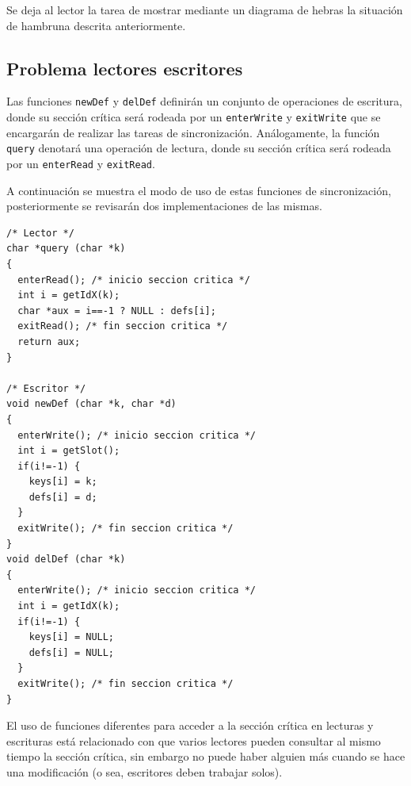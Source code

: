 Se deja al lector la tarea de mostrar mediante un diagrama de hebras la
situación de hambruna descrita anteriormente.

\subsection{Problema lectores escritores}

Las funciones \texttt{newDef} y \texttt{delDef} definirán un conjunto de
operaciones de escritura, donde su sección crítica será rodeada por un
\texttt{enterWrite} y \texttt{exitWrite} que se encargarán de realizar las
tareas de sincronización. Análogamente, la función \texttt{query} denotará una
operación de lectura, donde su sección crítica será rodeada por un
\texttt{enterRead} y \texttt{exitRead}.

A continuación se muestra el modo de uso de estas funciones de sincronización,
posteriormente se revisarán dos implementaciones de las mismas.

\begin{lstlisting}
/* Lector */
char *query (char *k)
{
  enterRead(); /* inicio seccion critica */
  int i = getIdX(k);
  char *aux = i==-1 ? NULL : defs[i];
  exitRead(); /* fin seccion critica */
  return aux;
}

/* Escritor */
void newDef (char *k, char *d)
{
  enterWrite(); /* inicio seccion critica */
  int i = getSlot();
  if(i!=-1) {
    keys[i] = k;
    defs[i] = d;
  }
  exitWrite(); /* fin seccion critica */
}
void delDef (char *k)
{
  enterWrite(); /* inicio seccion critica */
  int i = getIdX(k);
  if(i!=-1) {
    keys[i] = NULL;
    defs[i] = NULL;
  }
  exitWrite(); /* fin seccion critica */
}
\end{lstlisting}

El uso de funciones diferentes para acceder a la sección crítica en lecturas y
escrituras está relacionado con que varios lectores pueden consultar al mismo
tiempo la sección crítica, sin embargo no puede haber alguien más cuando
se hace una modificación (o sea, escritores deben trabajar solos).

